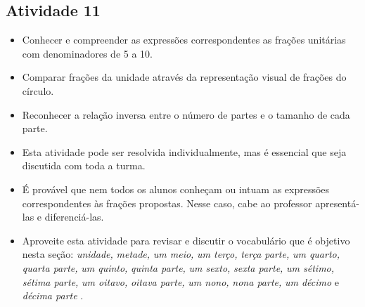 \subsection{Atividade 11}
   \vspace{.1cm}

\begin{itemize} %
    \item       Conhecer e compreender as expressões correspondentes as frações unitárias com denominadores de 5 a 10.
    \item       Comparar frações da unidade através da representação visual de frações do círculo.
    \item Reconhecer a relação inversa entre o número de partes e o tamanho de cada parte.
\end{itemize} %
 \vspace{.1cm}

   \vspace{.1cm}

  \begin{itemize} %
    \item       Esta atividade pode ser resolvida individualmente, mas é essencial que seja discutida com toda a turma.
    \item       É provável que nem todos os alunos conheçam ou intuam as expressões correspondentes às frações propostas. Nesse caso, cabe ao professor apresentá-las e diferenciá-las.
    \item       Aproveite esta atividade para revisar e discutir o vocabulário que é objetivo nesta seção:       {\it unidade,}             {\it metade,}             {\it um meio,}             {\it um terço,}             {\it terça parte,}             {\it um quarto,}             {\it quarta parte,}             {\it um quinto,}             {\it quinta parte,}             {\it um sexto,}             {\it sexta parte,}             {\it um sétimo,}             {\it sétima parte,}             {\it um oitavo,}             {\it oitava parte,}             {\it um nono,}             {\it nona parte,}             {\it um décimo}       e       {\it décima parte}      .
\end{itemize} %

